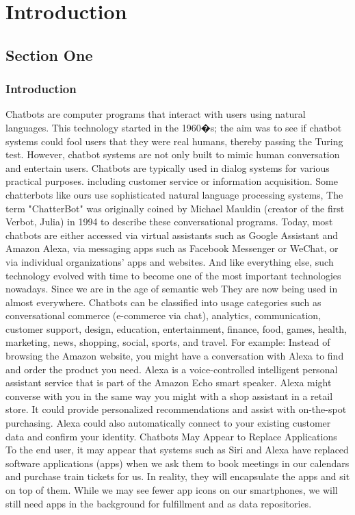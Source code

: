 \chapter{Introduction}
\label{chap:chap1}

\section{Section One}

  \subsection{Introduction}
  


Chatbots are computer programs that interact with users using natural languages. This technology started in the 1960�s; the aim was to see if chatbot systems could fool users that they were real humans, thereby passing the Turing test. However, chatbot systems are not only built to mimic human conversation and entertain users. Chatbots are typically used in dialog systems for various practical purposes. including customer service or information acquisition. Some chatterbots like ours use sophisticated natural language processing systems,
The term "ChatterBot" was originally coined by Michael Mauldin (creator of the first Verbot, Julia) in 1994 to describe these conversational programs. Today, most chatbots are either accessed via virtual assistants such as Google Assistant and Amazon Alexa, via messaging apps such as Facebook Messenger or WeChat, or via individual organizations' apps and websites. And like everything else, such technology evolved with time to become one of the most important technologies nowadays. Since we are in the age of semantic web They are now being used in almost everywhere. Chatbots can be classified into usage categories such as conversational commerce (e-commerce via chat), analytics, communication, customer support, design, education, entertainment, finance, food, games, health, marketing, news, shopping, social, sports, and travel.
For example: Instead of browsing the Amazon website, you might have a conversation with Alexa to find and order the product you need. Alexa is a voice-controlled intelligent personal assistant service that is part of the Amazon Echo smart speaker. Alexa might converse with you in the same way you might with a shop assistant in a retail store. It could provide personalized recommendations and assist with on-the-spot purchasing. Alexa could also automatically connect to your existing customer data and confirm your identity.
Chatbots May Appear to Replace Applications To the end user, it may appear that systems such as Siri and Alexa have replaced software applications (apps) when we ask them to book meetings in our calendars and purchase train tickets for us. In reality, they will encapsulate the apps and sit on top of them. While we may see fewer app icons on our smartphones, we will still need apps in the background for fulfillment and as data repositories.

